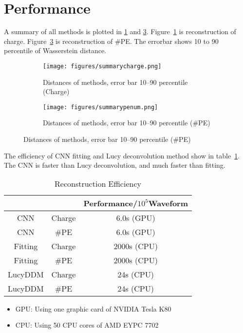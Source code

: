 \section{Performance} %
A summary of all methods is plotted in \ref{fig:chargesummary} and \ref{fig:penumsummary}. Figure~\ref{fig:chargesummary} is reconstruction of charge. Figure~\ref{fig:penumsummary} is reconstruction of \#PE. The errorbar shows 10 to 90 percentile of Wasserstein distance. 

\begin{figure}[H]
\begin{minipage}{.45\textwidth}
\begin{figure}[H]
    \centering
    \texttt{[image: figures/summarycharge.png]}
    \caption{\label{fig:chargesummary} Distances of methods, error bar 10--90 percentile (Charge)}
\end{figure}
\end{minipage}
\begin{minipage}{.45\textwidth}
\begin{figure}[H]
    \centering
    \texttt{[image: figures/summarypenum.png]}
    \caption{\label{fig:penumsummary} Distances of methods, error bar 10--90 percentile (\#PE)}
\end{figure}
\end{minipage}
\end{figure}

The efficiency of CNN fitting and Lucy deconvolution method show in table~\ref{fig:efficiency}. The CNN is faster than Lucy deconvolution, and much faster than fitting. 

\begin{table}[H]
    \centering
    \caption{\label{fig:efficiency} Reconstruction Efficiency}
    \begin{tabular}{c|c|c}
        \hline
        & & Performance/$10^{5}$Waveform \\
        \hline
        CNN & Charge & 6.0s (GPU) \\
        \hline
        CNN & \#PE & 6.0s (GPU)\\
        \hline
        Fitting & Charge & 2000s (CPU) \\
        \hline
        Fitting & \#PE & 2000s (CPU) \\
        \hline
        LucyDDM & Charge & 24s (CPU) \\
        \hline
        LucyDDM & \#PE & 24s (CPU) \\
        \hline
    \end{tabular}
\end{table}
\hspace{4mm}
\begin{center}
\begin{itemize}
    \item GPU: Using one graphic card of NVIDIA Tesla K80
    \item CPU: Using 50 CPU cores of AMD EYPC 7702
\end{itemize}
\end{center}

